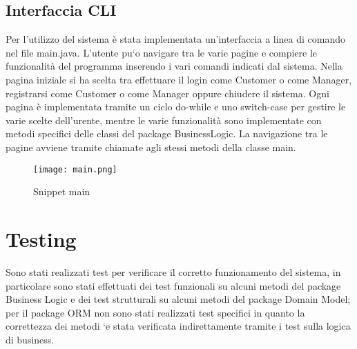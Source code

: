 \documentclass{article}
\begin{document}
\subsection{Interfaccia CLI}
Per l'utilizzo del sistema è stata implementata un'interfaccia a linea di comando nel file main.java. L’utente pu`o navigare tra le varie pagine e compiere le funzionalità del programma inserendo i vari comandi indicati dal sistema. Nella pagina iniziale si ha scelta tra effettuare il login come Customer o come Manager, registrarsi come Customer o come Manager oppure chiudere il sistema. Ogni pagina è implementata tramite un ciclo do-while e uno switch-case per gestire le varie scelte dell'urente, mentre le varie funzionalità sono implementate con metodi specifici delle classi del package BusinessLogic. La
navigazione tra le pagine avviene tramite chiamate agli stessi metodi della classe main.
\begin{figure}[h!]
    \centering
    \texttt{[image: main.png]}
    \caption{Snippet main}
    \label{fig:main}
\end{figure}
\newpage
\section{Testing}
Sono stati realizzati test per verificare il corretto funzionamento del sistema, in particolare
sono stati effettuati dei test funzionali su alcuni metodi del package Business Logic e
dei test strutturali su alcuni metodi del package Domain Model; per il package ORM non
sono stati realizzati test specifici in quanto la correttezza dei metodi `e stata verificata
indirettamente tramite i test sulla logica di business.
\end{document}
